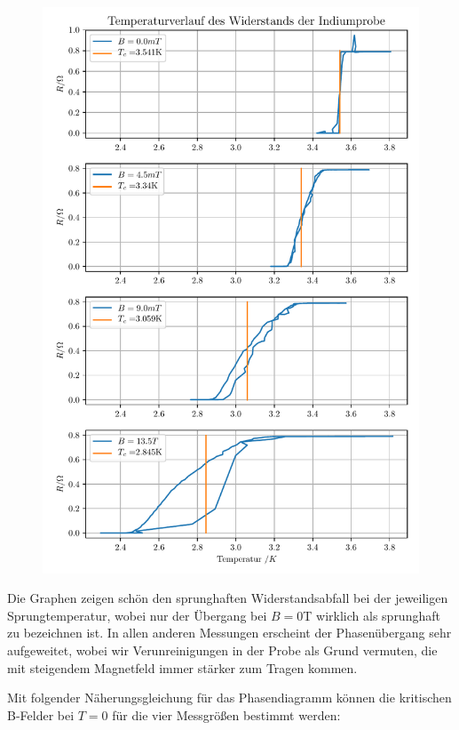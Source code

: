 \begin{figure}[h]
\includegraphics[width=\textwidth]{Temperaturverlauf_des_Widerstands_der_Indiumprobe.pdf}
\end{figure}

Die Graphen zeigen schön den sprunghaften Widerstandsabfall bei der jeweiligen Sprungtemperatur, wobei nur der Übergang bei $B=0$T wirklich als sprunghaft zu bezeichnen ist. In allen anderen Messungen erscheint der Phasenübergang sehr aufgeweitet, wobei wir Verunreinigungen in der Probe als Grund vermuten, die mit steigendem Magnetfeld immer stärker zum Tragen kommen. 


Mit folgender Näherungsgleichung für das Phasendiagramm können die kritischen B-Felder bei $T=0$ für die vier Messgrößen bestimmt werden:

